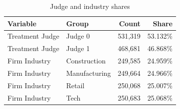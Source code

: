 \begin{table}[!htbp]
\centering
\caption{Judge and industry shares}
\label{tab:q1_shares}
\begin{tabular}{llrr}
\toprule
Variable & Group & Count & Share \\
\midrule
Treatment Judge & Judge 0 & 531,319 & 53.132\% \\
Treatment Judge & Judge 1 & 468,681 & 46.868\% \\
Firm Industry & Construction & 249,585 & 24.959\% \\
Firm Industry & Manufacturing & 249,664 & 24.966\% \\
Firm Industry & Retail & 250,068 & 25.007\% \\
Firm Industry & Tech & 250,683 & 25.068\% \\
\bottomrule
\end{tabular}
\end{table}
